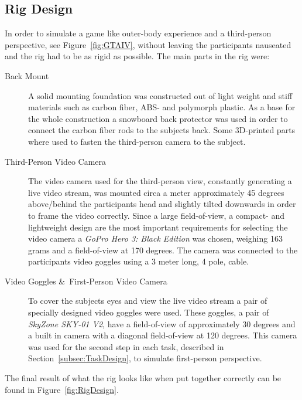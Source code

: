 \documentclass[runningheads,a4paper,oribibl]{llncs}
\begin{document}
\subsection{Rig Design}
In order to simulate a game like outer-body experience and a third-person perspective, see Figure~\ref{fig:GTAIV}, without leaving the participants nauseated and the rig had to be as rigid as possible. The main parts in the rig were:
\begin{description}

	\item[Back Mount] A solid mounting foundation was constructed out of light weight and stiff materials such as carbon fiber, ABS- and polymorph plastic. As a base for the whole construction a snowboard back protector was used in order to connect the carbon fiber rods to the subjects back. Some 3D-printed parts where used to fasten the third-person camera to the subject.

	\item[Third-Person Video Camera] The video camera used for the third-person view, constantly generating a live video stream, was mounted circa a meter approximately 45 degrees above/behind the participants head and slightly tilted downwards in order to frame the video correctly. Since a large field-of-view, a compact- and lightweight design are the most important requirements for selecting the video camera a \emph{GoPro Hero 3: Black Edition} was chosen, weighing 163 grams and a field-of-view at 170 degrees. The camera was connected to the participants video goggles using a 3 meter long, 4 pole, cable.

	\item[Video Goggles \&\ First-Person Video Camera] To cover the subjects eyes and view the live video stream a pair of specially designed video goggles were used. These goggles, a pair of \emph{SkyZone SKY-01 V2}, have a field-of-view of approximately 30 degrees and a built in camera with a diagonal field-of-view at 120 degrees. This camera was used for the second step in each task, described in Section~\ref{subsec:TaskDesign}, to simulate first-person perspective.
\end{description}
The final result of what the rig looks like when put together correctly can be found in Figure~\ref{fig:RigDesign}.
\end{document}
